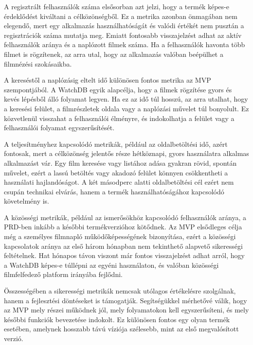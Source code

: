 A regisztrált felhasználók száma elsősorban azt jelzi, hogy a termék képes-e érdeklődést kiváltani a célközönségből. Ez a metrika azonban önmagában nem elegendő, mert egy alkalmazás használhatóságát és valódi értékét nem pusztán a regisztrációk száma mutatja meg. Emiatt fontosabb visszajelzést adhat az aktív felhasználók aránya és a naplózott filmek száma. Ha a felhasználók havonta több filmet is rögzítenek, az arra utal, hogy az alkalmazás valóban beépülhet a filmnézési szokásaikba.

A kereséstől a naplózásig eltelt idő különösen fontos metrika az MVP szempontjából. A WatchDB egyik alapcélja, hogy a filmek rögzítése gyors és kevés lépésből álló folyamat legyen. Ha ez az idő túl hosszú, az arra utalhat, hogy a keresési felület, a filmrészletek oldala vagy a naplózási művelet túl bonyolult. Ez közvetlenül visszahat a felhasználói élményre, és indokolhatja a felület vagy a felhasználói folyamat egyszerűsítését.

A teljesítményhez kapcsolódó metrikák, például az oldalbetöltési idő, azért fontosak, mert a célközönség jelentős része hétköznapi, gyors használatra alkalmas alkalmazást vár. Egy film keresése vagy listához adása gyakran rövid, spontán művelet, ezért a lassú betöltés vagy akadozó felület könnyen csökkentheti a használati hajlandóságot. A két másodperc alatti oldalbetöltési cél ezért nem csupán technikai elvárás, hanem a termék használhatóságához kapcsolódó követelmény is.

A közösségi metrikák, például az ismerősökhöz kapcsolódó felhasználók aránya, a PRD-ben inkább a későbbi termékverzióhoz kötődnek. Az MVP elsődleges célja még a személyes filmnapló működőképességének bizonyítása, ezért a közösségi kapcsolatok aránya az első három hónapban nem tekinthető alapvető sikerességi feltételnek. Hat hónapos távon viszont már fontos visszajelzést adhat arról, hogy a WatchDB képes-e túllépni az egyéni használaton, és valóban közösségi filmfelfedező platform irányába fejlődni.

Összességében a sikerességi metrikák nemcsak utólagos értékelésre szolgálnak, hanem a fejlesztési döntéseket is támogatják. Segítségükkel mérhetővé válik, hogy az MVP mely részei működnek jól, mely folyamatokon kell egyszerűsíteni, és mely későbbi funkciók bevezetése indokolt. Ez különösen fontos egy olyan termék esetében, amelynek hosszabb távú víziója szélesebb, mint az első megvalósított verzió.
